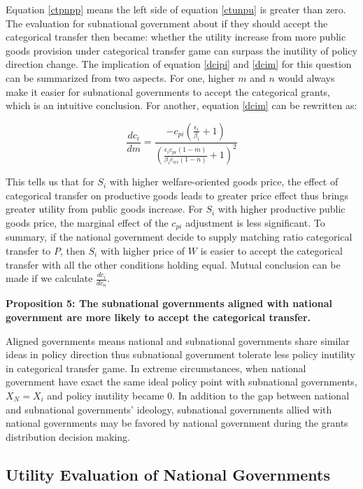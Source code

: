 \begin{itemize}
Equation \ref{ctpnpp} means the left side of equation \ref{ctunpu} is greater than zero. The evaluation for subnational government about if they should accept the categorical transfer then became: whether the utility increase from more public goods provision under categorical transfer game can surpass the inutility of policy direction change. The implication of equation \ref{dcipi} and \ref{dcim} for this question can be summarized from two aspects. For one, higher $m$ and $n$ would always make it easier for subnational governments to accept the categorical grants, which is an intuitive conclusion. For another, equation \ref{dcim} can be rewritten as:

\begin{equation}
    \frac{d c_i}{d m}= \frac{-c_{pi}(\frac{\epsilon_i}{\beta_i}+1)}{(\frac{\epsilon_ic_{pi}(1-m)}{\beta_ic_{wi}(1-n)}+1)^2}
\end{equation}

This tells us that for $S_i$ with higher welfare-oriented goods price, the effect of categorical transfer on productive goods leads to greater price effect thus brings greater utility from public goods increase. For $S_i$ with higher productive public goods price, the marginal effect of the $c_{pi}$ adjustment is less significant. To summary, if the national government decide to supply matching ratio categorical transfer to $P$, then $S_i$ with higher price of $W$ is easier to accept the categorical transfer with all the other conditions holding equal. Mutual conclusion can be made if we calculate $\frac{dc_i}{dc_{n}}$.

\textbf{Proposition 5: The subnational governments aligned with national government are more likely to accept the categorical transfer.}

Aligned governments means national and subnational governments share similar ideas in policy direction thus subnational government tolerate less policy inutility in categorical transfer game. In extreme circumstances, when national government have exact the same ideal policy point with subnational governments, $X_N = X_i$ and policy inutility became 0. In addition to the gap between national and subnational governments' ideology, subnational governments allied with national governments may be favored by national government during the grants distribution decision making.

\subsection{Utility Evaluation of National Governments}


\end{itemize}
